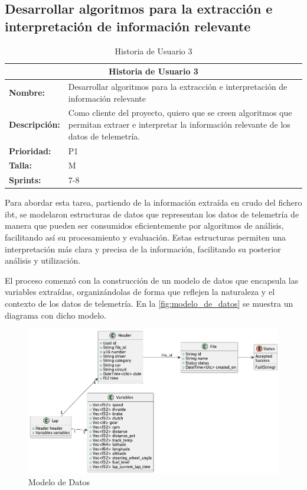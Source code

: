 \subsection{Desarrollar algoritmos para la extracción e interpretación de información relevante}
\begin{table}[H]
\centering
\begin{tabular}{|l|p{10cm}|}
\hline
\multicolumn{2}{|c|}{\textbf{Historia de Usuario 3}} \\ \hline
\textbf{Nombre:} & Desarrollar algoritmos para la extracción e interpretación de información relevante \\ \hline
\textbf{Descripción:} & Como cliente del proyecto, quiero que se creen algoritmos que permitan extraer e interpretar la información relevante de los datos de telemetría. \\ \hline
\textbf{Prioridad:} & P1 \\ \hline
\textbf{Talla:} & M \\ \hline
\textbf{Sprints:} & 7-8 \\ \hline
\end{tabular}
\caption{Historia de Usuario 3}
\label{tab:us_extraccion_interpretacion}
\end{table}

Para abordar esta tarea, partiendo de la información extraída en crudo del fichero \ac{ibt}, se modelaron estructuras de datos que representan los datos de telemetría de manera que pueden ser consumidos eficientemente por algoritmos de análisis, facilitando así su procesamiento y evaluación. Estas estructuras permiten una interpretación más clara y precisa de la información, facilitando su posterior análisis y utilización.

El proceso comenzó con la construcción de un modelo de datos que encapsula las variables extraídas, organizándolas de forma que reflejen la naturaleza y el contexto de los datos de telemetría. En la \autoref{fig:modelo_de_datos} se muestra un diagrama con dicho modelo.

\begin{figure}[H]
	\centering
	\includegraphics[width=1\linewidth]{./figs/herramientas/desarrollo/modelo_de_datos.png}
	\caption[Modelo de Datos]{Modelo de Datos}
    \label{fig:modelo_de_datos}
\end{figure}

